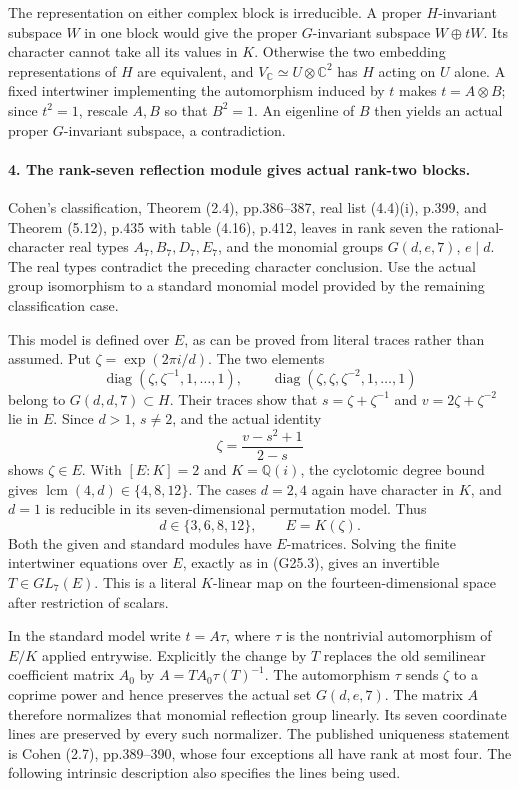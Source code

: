 The representation on either complex block is irreducible.
A proper \(H\)-invariant subspace \(W\) in one block would
give the proper \(G\)-invariant subspace \(W\oplus tW\).
Its character cannot take all its values in \(K\). Otherwise
the two embedding representations of \(H\) are equivalent,
and \(V_{\mathbb C}\simeq U\otimes\mathbb C^2\) has
\(H\) acting on \(U\) alone. A fixed intertwiner implementing
the automorphism induced by \(t\) makes
\(t=A\otimes B\); since \(t^2=1\), rescale \(A,B\)
so that \(B^2=1\). An eigenline of \(B\) then yields an
actual proper \(G\)-invariant subspace, a contradiction.

\paragraph{4. The rank-seven reflection module gives actual rank-two blocks.}
Cohen's classification, Theorem (2.4), pp.386--387, real list
(4.4)(i), p.399, and Theorem (5.12), p.435 with table (4.16),
p.412, leaves in rank seven the rational-character real types
\(A_7,B_7,D_7,E_7\), and the monomial groups
\(G(d,e,7)\), \(e\mid d\).
The real types contradict the preceding character conclusion.
Use the actual group isomorphism to a standard monomial model
provided by the remaining classification case.

This model is defined over \(E\), as can be proved from literal
traces rather than assumed. Put \(\zeta=\exp(2\pi i/d)\).
The two elements
\[
 \operatorname{diag}(\zeta,\zeta^{-1},1,\ldots,1),\qquad
 \operatorname{diag}(\zeta,\zeta,\zeta^{-2},1,\ldots,1)
\]
belong to \(G(d,d,7)\subset H\). Their traces show that
\(s=\zeta+\zeta^{-1}\) and
\(v=2\zeta+\zeta^{-2}\) lie in \(E\). Since \(d>1\),
\(s\ne2\), and the actual identity
\[
                   \zeta=\frac{v-s^2+1}{2-s}                 \tag{S38.10}
\]
shows \(\zeta\in E\). With \([E:K]=2\) and
\(K=\mathbb Q(i)\), the cyclotomic degree bound gives
\(\operatorname{lcm}(4,d)\in\{4,8,12\}\).
The cases \(d=2,4\) again have character in \(K\), and
\(d=1\) is reducible in its seven-dimensional permutation
model. Thus
\[
                 d\in\{3,6,8,12\},\qquad E=K(\zeta).
                                                               \tag{S38.11}
\]
Both the given and standard modules have \(E\)-matrices.
Solving the finite intertwiner equations over \(E\), exactly
as in (G25.3), gives an invertible \(T\in GL_7(E)\).
This is a literal \(K\)-linear map on the fourteen-dimensional
space after restriction of scalars.

In the standard model write \(t=A\tau\), where
\(\tau\) is the nontrivial automorphism of \(E/K\) applied
entrywise. Explicitly the change by \(T\) replaces the old
semilinear coefficient matrix \(A_0\) by
\(A=T A_0\tau(T)^{-1}\).
The automorphism \(\tau\) sends \(\zeta\) to a coprime power and hence
preserves the actual set \(G(d,e,7)\). The matrix \(A\)
therefore normalizes that monomial reflection group linearly.
Its seven coordinate lines are preserved by every such normalizer.
The published uniqueness statement is Cohen (2.7), pp.389--390,
whose four exceptions all have rank at most four. The following
intrinsic description also specifies the lines being used.

